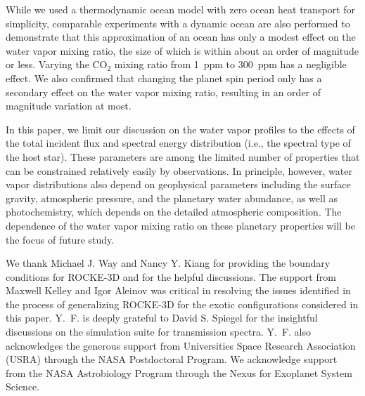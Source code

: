 \documentclass[11pt,numberedappendix,twocolappendix,]{emulateapj}
\def\modelE{ROCKE-3D}
\def\wv{water vapor}
\newcommand{\yf}[1]{{\color{orange}#1}}
\begin{document}
While we used a thermodynamic ocean model with zero ocean heat transport for simplicity, comparable experiments with a dynamic ocean are also performed to demonstrate that this approximation of an ocean \yf{has only a modest effect} on the \wv{} mixing ratio, the size of which is within about an order of magnitude \yf{or less}. 
Varying the CO$_2$ mixing ratio from 1~ppm to 300~ppm has a negligible effect. 
We also confirmed that changing the planet spin period only has a secondary effect on the \wv{} mixing ratio, resulting in an order of magnitude variation at most. 


In this paper, we limit our discussion on the \wv{} profiles to the effects of the total incident flux and spectral energy distribution (i.e., the spectral type of the host star). 
These parameters are among the limited number of properties that can be constrained relatively easily by observations. 
In principle, however, \wv{} distributions also depend on geophysical parameters including the surface gravity, atmospheric pressure, \yf{and the planetary water abundance}, as well as photochemistry, which depends on the detailed atmospheric composition. 
The dependence of the \wv{} mixing ratio on these planetary properties will be  the focus of future study. 





\acknowledgments
We thank Michael J. Way and Nancy Y. Kiang for providing the boundary conditions for \modelE{} and for the helpful discussions. 
The support from Maxwell Kelley and Igor Aleinov was critical in resolving the issues identified in the process of generalizing \modelE{} for the exotic configurations considered in this paper. 
Y.~F. is deeply grateful to David S. Spiegel for the insightful discussions on the simulation suite for transmission spectra. 
Y.~F. also acknowledges the generous support from Universities Space Research Association (USRA) through the NASA Postdoctoral Program. 
We acknowledge support from the NASA Astrobiology Program through the Nexus for Exoplanet System Science.




\appendix


\end{document}
